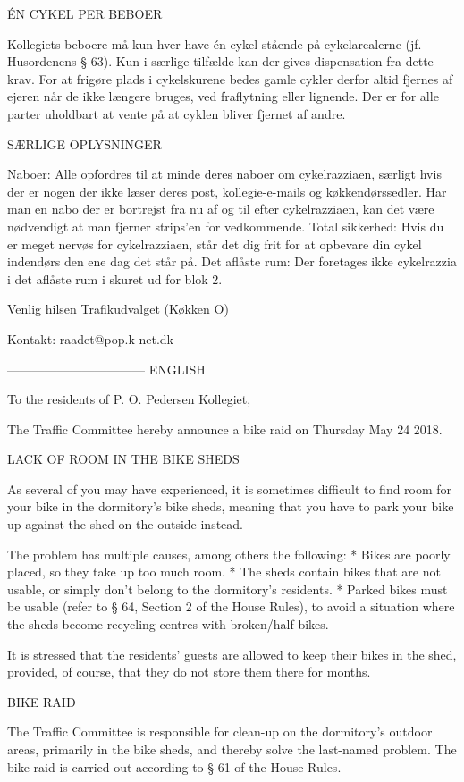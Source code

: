 ÉN CYKEL PER BEBOER

Kollegiets beboere må kun hver have én cykel stående på cykelarealerne (jf. Husordenens § 63). Kun i særlige tilfælde kan der gives dispensation fra dette krav. For at frigøre plads i cykelskurene bedes gamle cykler derfor altid fjernes af ejeren når de ikke længere bruges, ved fraflytning eller lignende. Der er for alle parter uholdbart at vente på at cyklen bliver fjernet af andre.


SÆRLIGE OPLYSNINGER

Naboer: Alle opfordres til at minde deres naboer om cykelrazziaen, særligt hvis der er nogen der ikke læser deres post, kollegie-e-mails og køkkendørssedler. Har man en nabo der er bortrejst fra nu af og til efter cykelrazziaen, kan det være nødvendigt at man fjerner strips'en for vedkommende.
Total sikkerhed: Hvis du er meget nervøs for cykelrazziaen, står det dig frit for at opbevare din cykel indendørs den ene dag det står på.
Det aflåste rum: Der foretages ikke cykelrazzia i det aflåste rum i skuret ud for blok 2.

Venlig hilsen
Trafikudvalget (Køkken O)

Kontakt: raadet@pop.k-net.dk


---------------------------------
ENGLISH

To the residents of P. O. Pedersen Kollegiet,

The Traffic Committee hereby announce a bike raid on Thursday May 24 2018.


LACK OF ROOM IN THE BIKE SHEDS

As several of you may have experienced, it is sometimes difficult to find room for your bike in the dormitory's bike sheds, meaning that you have to park your bike up against the shed on the outside instead.

The problem has multiple causes, among others the following:
* Bikes are poorly placed, so they take up too much room.
* The sheds contain bikes that are not usable, or simply don’t belong to the dormitory’s residents.
* Parked bikes must be usable (refer to § 64, Section 2 of the House Rules), to avoid a situation where the sheds become recycling centres with broken/half bikes.

It is stressed that the residents' guests are allowed to keep their bikes in the shed, provided, of course, that they do not store them there for months.


BIKE RAID

The Traffic Committee is responsible for clean-up on the dormitory's outdoor areas, primarily in the bike sheds, and thereby solve the last-named problem. The bike raid is carried out according to § 61 of the House Rules.

